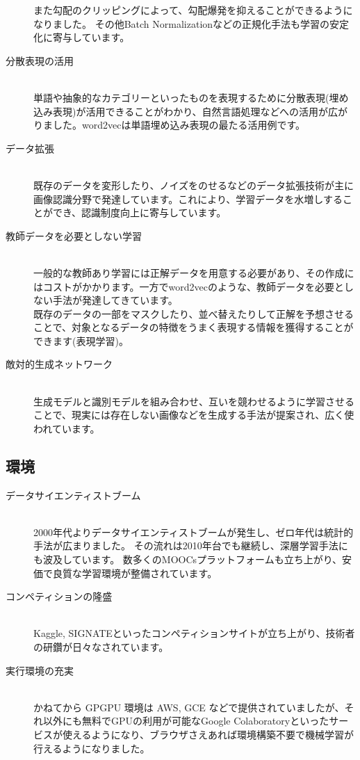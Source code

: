 \documentclass[mingoth,a4paper]{jsarticle}
\begin{document}
\begin{description}
  また勾配のクリッピングによって、勾配爆発を抑えることができるようになりました。
  その他Batch Normalizationなどの正規化手法も学習の安定化に寄与しています。
\item[分散表現の活用]  \mbox{} \\
  単語や抽象的なカテゴリーといったものを表現するために分散表現(埋め込み表現)が活用できることがわかり、自然言語処理などへの活用が広がりました。word2vecは単語埋め込み表現の最たる活用例です。
\item[データ拡張]  \mbox{} \\
  既存のデータを変形したり、ノイズをのせるなどのデータ拡張技術が主に画像認識分野で発達しています。これにより、学習データを水増しすることができ、認識制度向上に寄与しています。
\item[教師データを必要としない学習]  \mbox{} \\
  一般的な教師あり学習には正解データを用意する必要があり、その作成にはコストがかかります。一方でword2vecのような、教師データを必要としない手法が発達してきています。\\
  既存のデータの一部をマスクしたり、並べ替えたりして正解を予想させることで、対象となるデータの特徴をうまく表現する情報を獲得することができます(表現学習)。
\item[敵対的生成ネットワーク]  \mbox{} \\
  生成モデルと識別モデルを組み合わせ、互いを競わせるように学習させることで、現実には存在しない画像などを生成する手法が提案され、広く使われています。
\end{description}

\subsection{環境}

\begin{description}
\item[データサイエンティストブーム] \mbox{} \\
  2000年代よりデータサイエンティストブームが発生し、ゼロ年代は統計的手法が広まりました。
  その流れは2010年台でも継続し、深層学習手法にも波及しています。
  数多くのMOOCsプラットフォームも立ち上がり、安価で良質な学習環境が整備されています。
\item[コンペティションの隆盛] \mbox{} \\
  Kaggle, SIGNATEといったコンペティションサイトが立ち上がり、技術者の研鑽が日々なされています。
\item[実行環境の充実] \mbox{} \\
  かねてから GPGPU 環境は AWS, GCE などで提供されていましたが、それ以外にも無料でGPUの利用が可能なGoogle Colaboratoryといったサービスが使えるようになり、ブラウザさえあれば環境構築不要で機械学習が行えるようになりました。
\end{description}
\end{document}
